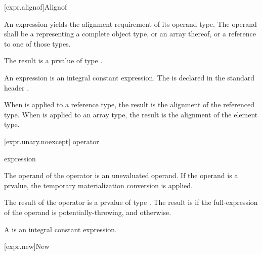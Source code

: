[expr.alignof]{Alignof}

\pnum
{}%
%
An  expression yields the alignment requirement
of its operand type. The operand shall be a 
representing a complete object type, or an array thereof, or a reference
to one of those types.

\pnum
The result is a prvalue of type .
\begin{note}
An  expression
is an integral constant expression.
The   is declared in the standard header
.
\end{note}

\pnum
When  is applied to a reference type, the result
is the alignment of the referenced type. When 
is applied to an array type, the result is the alignment of the
element type.

[expr.unary.noexcept]{ operator}

%
%

\begin{bnf}
\br
   \terminal{(} expression \terminal{)}
\end{bnf}

\pnum
The operand of the  operator
is an unevaluated operand.
If the operand is a prvalue,
the temporary materialization conversion is applied.

\pnum
The result of the  operator is a prvalue of type .
The result is  if
the full-expression of the operand is potentially-throwing, and
 otherwise.
\begin{note}
A 
is an integral constant expression.
\end{note}

[expr.new]{New}

